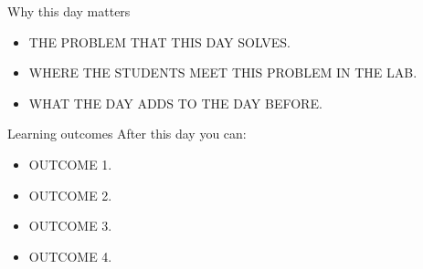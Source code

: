 \begin{frame}{Why this day matters}
  \begin{itemize}
    \item THE PROBLEM THAT THIS DAY SOLVES.
    \item WHERE THE STUDENTS MEET THIS PROBLEM IN THE LAB.
    \item WHAT THE DAY ADDS TO THE DAY BEFORE.
  \end{itemize}
\end{frame}

\begin{frame}{Learning outcomes}
  After this day you can:
  \begin{itemize}
    \item OUTCOME 1.
    \item OUTCOME 2.
    \item OUTCOME 3.
    \item OUTCOME 4.
  \end{itemize}
\end{frame}
